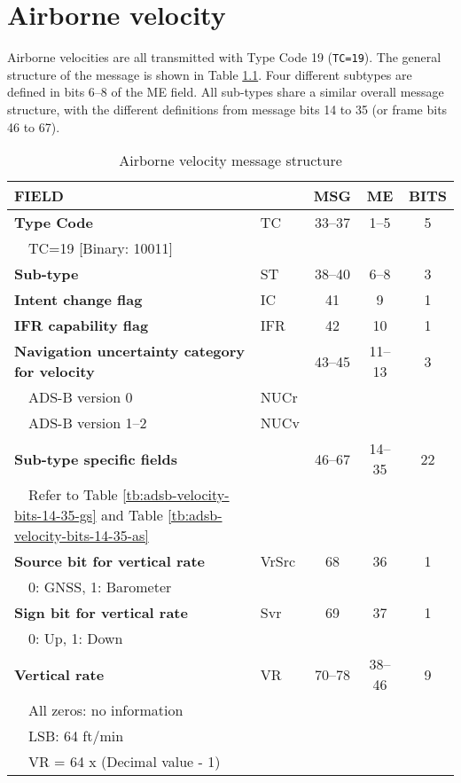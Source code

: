 \chapter{Airborne velocity}

Airborne velocities are all transmitted with Type Code 19 (\texttt{TC=19}). The general structure of the message is shown in Table \ref{tb:adsb-velocity-bits}. Four different subtypes are defined in bits 6--8 of the ME field. All sub-types share a similar overall message structure, with the different definitions from message bits 14 to 35 (or frame bits 46 to 67). 

\begin{table}[ht]
\caption{Airborne velocity message structure}
\label{tb:adsb-velocity-bits}
\footnotesize
\begin{tabular}{|l|l|c|c|c|}
\hline
\textbf{FIELD} & & \textbf{MSG} & \textbf{ME} & \textbf{BITS} \\ \hline
\hline
\textbf{Type Code} & TC & 33--37 & 1--5 & 5\\
~~TC=19 {[}Binary: 10011{]} &&&& \\ \hline
\textbf{Sub-type} & ST & 38--40 & 6--8 & 3\\
\hline
\textbf{Intent change flag} & IC & 41 & 9 & 1 \\ \hline
\textbf{IFR capability flag} & IFR & 42 & 10 & 1 \\ \hline
\textbf{Navigation uncertainty category for velocity} & & 43--45 & 11--13 & 3\\
~~ADS-B version 0 & NUCr &&&\\
~~ADS-B version 1--2 & NUCv &&&\\ \hline
\hline
\textbf{Sub-type specific fields} & & 46--67 & 14--35 & 22\\
~~Refer to Table \ref{tb:adsb-velocity-bits-14-35-gs} and Table \ref{tb:adsb-velocity-bits-14-35-as} &&&& \\ \hline
\hline
\textbf{Source bit for vertical rate} & VrSrc & 68 & 36 & 1 \\
~~0: GNSS, 1: Barometer &&&&\\ \hline
\textbf{Sign bit for vertical rate}  & Svr & 69 & 37 & 1 \\
~~0: Up, 1: Down &&&& \\ \hline
\textbf{Vertical rate} & VR & 70--78 & 38--46 & 9\\
~~All zeros: no information &&&&\\
~~LSB: 64 ft/min &&&&\\
~~VR = 64 x (Decimal value - 1) &&&& \\ \hline

\end{tabular}
\end{table}
